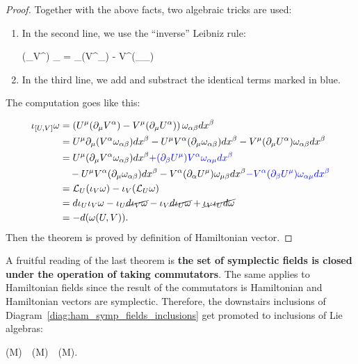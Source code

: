 \documentclass[main.tex]{subfiles}
\begin{document}
\begin{proof}
	Together with the above facts, two algebraic tricks are used:

	\begin{enumerate}
		\item In the second line, we use the ``inverse'' Leibniz rule:
		\begin{eqalign}
			(\partial_\mu V^\alpha) \omega_{\alpha\beta} = \partial_\mu (V^\alpha \omega_\alpha \beta) - V^\alpha (\partial_\mu \omega_{\alpha\beta})
		\end{eqalign}
		\item In the third line, we add and substract the identical terms marked in blue.
	\end{enumerate}

	The computation goes like this:

	\begin{equation}
		\begin{aligned}
			\iota_{[U,V]} \omega &= \left( U^\mu (\partial_\mu V^\alpha) - V^\mu (\partial_\mu U^\alpha) \right) \omega_{\alpha\beta} dx^\beta\\
			&= U^\mu \partial_\mu (V^\alpha \omega_{\alpha\beta}) dx^\beta - U^\mu V^\alpha (\partial_\mu \omega_{\alpha\beta}) dx^\beta - V^\mu (\partial_\mu U^\alpha) \omega_{\alpha\beta}dx^\beta\\
			&= U^\mu (\partial_\mu V^\alpha \omega_{\alpha\beta}) dx^\beta \textcolor{blue}{+ (\partial_\beta U^\mu) V^\alpha \omega_{\alpha \mu} dx^\beta}\\
			&\quad - U^\mu V^\alpha (\partial_\mu \omega_{\alpha\beta}) dx^\beta - V^\alpha (\partial_\alpha U^\mu) \omega_{\mu\beta}dx^\beta \textcolor{blue}{- V^\alpha (\partial_\beta U^\mu) \omega_{\alpha \mu} dx^\beta}\\
			&= \mathcal{L}_{U} (\iota_{V} \omega) - \iota_{V} (\mathcal{L}_{U}\omega)\\
			&= d \iota_{U} \iota_{V} \omega - \iota_{U} \cancel{d\iota_{V} \omega} - \iota_{V} \cancel{d \iota_{U} \omega} + \cancel{\iota_{V} \iota_{U} d\omega}\\
			&= -d (\omega(U,V)).
		\end{aligned}
	\end{equation}
	Then the theorem is proved by definition of Hamiltonian vector.
\end{proof}

\begin{remark}
	A fruitful reading of the last theorem is \textbf{the set of symplectic fields is closed under the operation of taking commutators}. The same applies to Hamiltonian fields since the result of the commutators is Hamiltonian and Hamiltonian vectors are symplectic. Therefore, the downstairs inclusions of Diagram~\ref{diag:ham_symp_fields_inclusions} get promoted to inclusions of Lie algebras:
	\begin{eqalign}
		\hamfields(M)\ \subseteq\ \sympfields(M)\ \subseteq\ \fields(M).
	\end{eqalign}
\end{remark}
\end{document}
